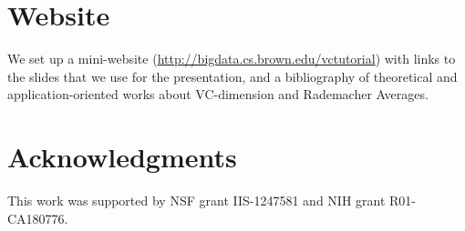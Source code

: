 \documentclass{sig-alternate-2013}
\begin{document}
\section{Website}\label{sec:website}
We set up a mini-website (\url{http://bigdata.cs.brown.edu/vctutorial}) with
links to the slides that we use for the presentation, and a bibliography of
theoretical and application-oriented works about VC-dimension and Rademacher
Averages.

\section{Acknowledgments}\label{sec:ack}
This work was supported by NSF grant IIS-1247581 and NIH grant R01-CA180776.



\end{document}
